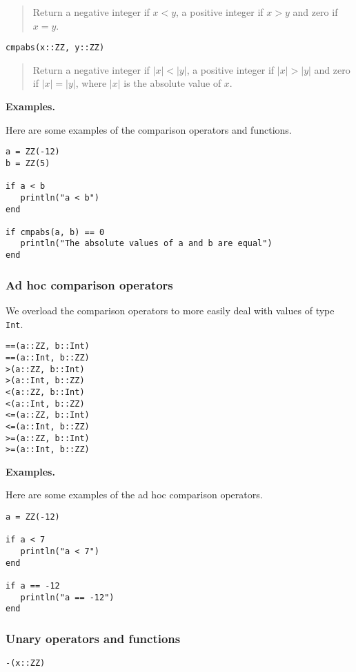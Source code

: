 \documentclass[a4paper,10pt]{article}
\newcommand{\code}{\lstinline}
\newcommand{\desc}[1]{\vspace{-3mm}\begin{quote}#1\end{quote}}
\begin{document}
{{{\desc{Return a negative integer if $x < y$, a positive integer if $x > y$ and zero if $x = y$.}

\begin{lstlisting}
cmpabs(x::ZZ, y::ZZ)
\end{lstlisting}

\desc{Return a negative integer if $|x| < |y|$, a positive integer if $|x| > |y|$ and zero if 
$|x| = |y|$, where $|x|$ is the absolute value of $x$.}

\textbf{Examples.}

Here are some examples of the comparison operators and functions.

\begin{lstlisting}
a = ZZ(-12)
b = ZZ(5)

if a < b
   println("a < b")
end

if cmpabs(a, b) == 0
   println("The absolute values of a and b are equal")
end
\end{lstlisting}

\subsubsection{Ad hoc comparison operators}

We overload the comparison operators to more easily deal with values of type \code{Int}.

\begin{lstlisting}
==(a::ZZ, b::Int)
==(a::Int, b::ZZ)
>(a::ZZ, b::Int)
>(a::Int, b::ZZ)
<(a::ZZ, b::Int)
<(a::Int, b::ZZ)
<=(a::ZZ, b::Int)
<=(a::Int, b::ZZ)
>=(a::ZZ, b::Int)
>=(a::Int, b::ZZ)
\end{lstlisting}

\textbf{Examples.}

Here are some examples of the ad hoc comparison operators.

\begin{lstlisting}
a = ZZ(-12)

if a < 7
   println("a < 7")
end

if a == -12
   println("a == -12")
end
\end{lstlisting}

\subsubsection{Unary operators and functions}

\begin{lstlisting}
-(x::ZZ)
\end{lstlisting}

}}}
\end{document}
